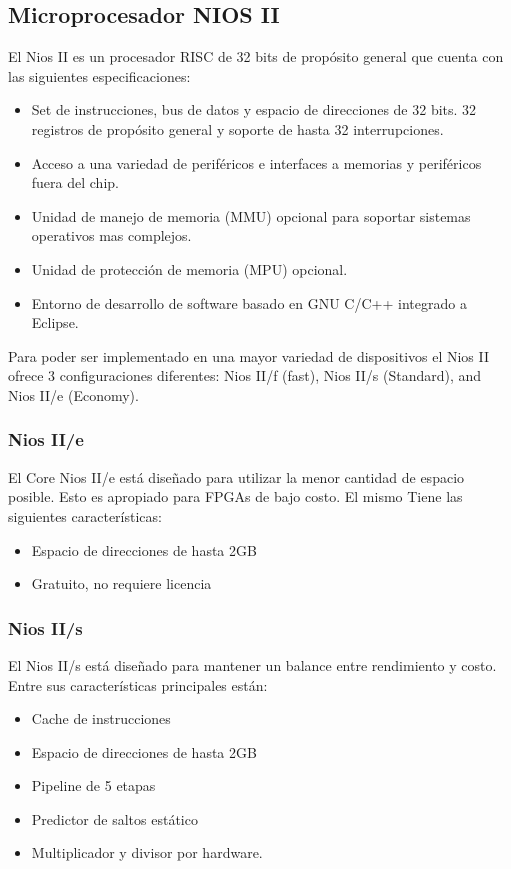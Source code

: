 \subsection{Microprocesador NIOS II}
El Nios II es un procesador RISC de 32 bits de propósito general que cuenta con las siguientes especificaciones:
\begin{itemize}
	\item Set de instrucciones, bus de datos y espacio de direcciones de 32 bits. 32 registros de propósito general y soporte de hasta 32 interrupciones.
	\item Acceso a una variedad de periféricos e interfaces a memorias y periféricos fuera del chip.
	\item Unidad de manejo de memoria (MMU) opcional para soportar sistemas operativos mas complejos.
	\item Unidad de protección de memoria (MPU) opcional.
	\item Entorno de desarrollo de software basado en GNU C/C++ integrado a Eclipse.
\end{itemize}

Para poder ser implementado en una mayor variedad de dispositivos el Nios II ofrece 3 configuraciones diferentes:  Nios II/f (fast), Nios II/s (Standard), and Nios II/e (Economy).

\subsubsection{Nios II/e}
El Core Nios II/e está diseñado para utilizar la menor cantidad de espacio posible. Esto es apropiado para FPGAs de bajo costo. El mismo Tiene las siguientes características:
\begin{itemize}
	\item Espacio de direcciones de hasta 2GB
	\item Gratuito, no requiere licencia 
\end{itemize}

\subsubsection{Nios II/s}
El Nios II/s está diseñado para mantener un balance entre rendimiento y costo. Entre sus características principales están:

\begin{itemize}
	\item Cache de instrucciones
	\item Espacio de direcciones de hasta 2GB
	\item Pipeline de 5 etapas
	\item Predictor de saltos estático
	\item Multiplicador y divisor por hardware. 
\end{itemize}

